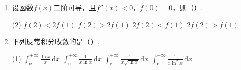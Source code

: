 \documentclass[../Main.tex]{subfiles}
\begin{document}
\begin{enumerate}
          \begin{tasks}[label=\textbf{\Alph*.}, label-width=1.5em, column-sep=1em](2)
              \task $3x-\mathrm{e}^{-\frac{x}{2}}+C$
              \task $3x-2\mathrm{e}^{-\frac{x}{2}}+C$
              \task $3x+4\mathrm{e}^{-\frac{x}{2}}+C$
              \task $3x-4\mathrm{e}^{-\frac{x}{2}}+C$
          \end{tasks}
          \vspace{1em}

    \item 设函数$f(x)$二阶可导，且$f''(x)<0$，$f(0)=0$，则（\qquad）.

          \begin{tasks}[label=\textbf{\Alph*.}, label-width=1.5em, column-sep=1em](2)
              \task $f(2)<2f(1)$
              \task $f(2)>2f(1)$
              \task $2f(2)<f(1)$
              \task $2f(2)>f(1)$
          \end{tasks}
          \vspace{1em}

    \item 下列反常积分收敛的是（\qquad）.

          \begin{tasks}[label=\textbf{\Alph*.}, label-width=1.5em, column-sep=1em](1)
              \task $\int_{\mathrm{e}}^{+\infty}\frac{\ln x}{x}\,\mathrm{d}x$
              \task $\int_{\mathrm{e}}^{+\infty}\frac{1}{x\ln x}\,\mathrm{d}x$
              \task $\int_{\mathrm{e}}^{+\infty}\frac{1}{x\sqrt{\ln x}}\,\mathrm{d}x$
              \task $\int_{\mathrm{e}}^{+\infty}\frac{1}{x\ln^{2}x}\,\mathrm{d}x$
          \end{tasks}
          \vspace{1em}
\end{enumerate}
\end{document}
